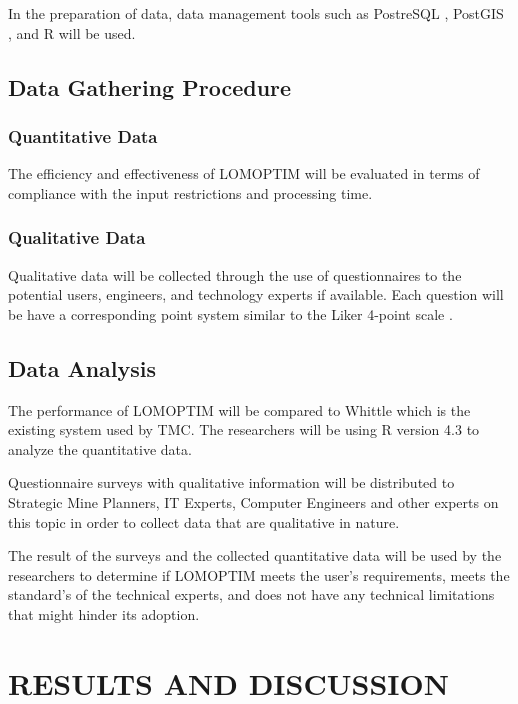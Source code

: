 \documentclass[12pt]{report}
\begin{document}
In the preparation of data, data management tools such as PostreSQL \cite{postgres}, PostGIS \cite{postgis}, and R \cite{R} will be used.

\section{Data Gathering Procedure}

\subsection{Quantitative Data}

The efficiency and effectiveness of LOMOPTIM will be evaluated in terms of compliance with the input restrictions and processing time.

\subsection{Qualitative Data}

Qualitative data will be collected through the use of questionnaires to the potential users, engineers, and technology experts if available.
Each question will be have a corresponding point system similar to the Liker 4-point scale \cite{Likert}.

\section{Data Analysis}

The performance of LOMOPTIM will be compared to Whittle which is the existing system used by TMC.
The researchers will be using R version 4.3 \cite{R} to analyze the quantitative data.

Questionnaire surveys with qualitative information will be distributed to Strategic Mine Planners, IT Experts, Computer Engineers and other experts on this topic in order to collect data that are qualitative in nature.

The result of the surveys and the collected quantitative data will be used by the researchers to determine if LOMOPTIM meets the user's requirements, meets the standard's of the technical experts, and does not have any technical limitations that might hinder its adoption.

\chapter{RESULTS AND DISCUSSION}
\end{document}
